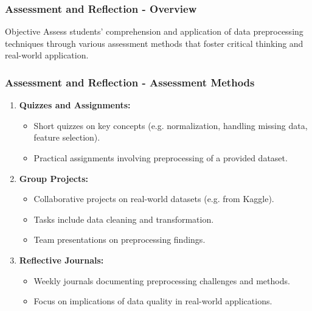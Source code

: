 \documentclass[aspectratio=169]{beamer}
\begin{document}
\begin{frame}[fragile]
    \frametitle{Assessment and Reflection - Overview}
    \begin{block}{Objective}
        Assess students' comprehension and application of data preprocessing techniques through various assessment methods that foster critical thinking and real-world application.
    \end{block}
\end{frame}

\begin{frame}[fragile]
    \frametitle{Assessment and Reflection - Assessment Methods}
    \begin{enumerate}
        \item \textbf{Quizzes and Assignments:}
        \begin{itemize}
            \item Short quizzes on key concepts (e.g. normalization, handling missing data, feature selection).
            \item Practical assignments involving preprocessing of a provided dataset.
        \end{itemize}
        
        \item \textbf{Group Projects:}
        \begin{itemize}
            \item Collaborative projects on real-world datasets (e.g. from Kaggle).
            \item Tasks include data cleaning and transformation.
            \item Team presentations on preprocessing findings.
        \end{itemize}
        
        \item \textbf{Reflective Journals:}
        \begin{itemize}
            \item Weekly journals documenting preprocessing challenges and methods.
            \item Focus on implications of data quality in real-world applications.
        \end{itemize}
    \end{enumerate}
\end{frame}
\end{document}

